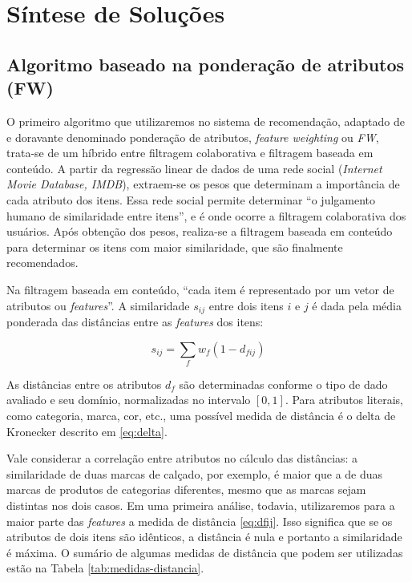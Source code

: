 \chapter[Síntese de Soluções]{Síntese de Soluções}
\label{chap:sintese_de_solucoes}

\section{Algoritmo baseado na ponderação de atributos (FW)} %
\label{sec:algoritmo_baseado_na_pondera_o_de_atributos_}


O primeiro algoritmo que utilizaremos no sistema de recomendação, adaptado de  \cite{symeonidis2007feature} e doravante denominado ponderação de atributos, \textit{feature weighting} ou \textit{FW}, trata-se de um híbrido entre filtragem colaborativa e filtragem baseada em conteúdo. A partir da regressão linear de dados de uma rede social (\textit{Internet Movie Database, IMDB}), extraem-se os pesos que determinam a importância de cada atributo dos itens. Essa rede social permite determinar ``o julgamento humano de similaridade entre itens'', e é onde ocorre a filtragem colaborativa dos usuários. Após obtenção dos pesos, realiza-se a filtragem baseada em conteúdo para determinar os itens com maior similaridade, que são finalmente recomendados.

Na filtragem baseada em conteúdo, ``cada item é representado por um vetor de atributos ou \textit{features}''. A similaridade $s_{ij}$ entre dois itens $i$ e $j$ é dada pela média ponderada das distâncias entre as \textit{features} dos itens:

\begin{equation} 
\label{eq:sij}
    s_{ij} = \sum_{f}{w_{f} \left(1-d_{fij}\right)}
\end{equation}

As distâncias entre os atributos $d_f$ são determinadas conforme o tipo de dado avaliado e seu domínio, normalizadas no intervalo $\left[0,1\right]$. Para atributos literais, como categoria, marca, cor, etc., uma possível medida de distância é o delta de Kronecker descrito em \ref{eq:delta}. 

Vale considerar a correlação entre atributos no cálculo das distâncias: a similaridade de duas marcas de calçado, por exemplo, é maior que a de duas marcas de produtos de categorias diferentes, mesmo que as marcas sejam distintas nos dois casos. Em uma primeira análise, todavia, utilizaremos para a maior parte das \textit{features} a medida de distância \ref{eq:dfij}. Isso significa que se os atributos de dois itens são idênticos, a distância é nula e portanto a similaridade é máxima. O sumário de algumas medidas de distância que podem ser utilizadas estão na Tabela \ref{tab:medidas-distancia}.

